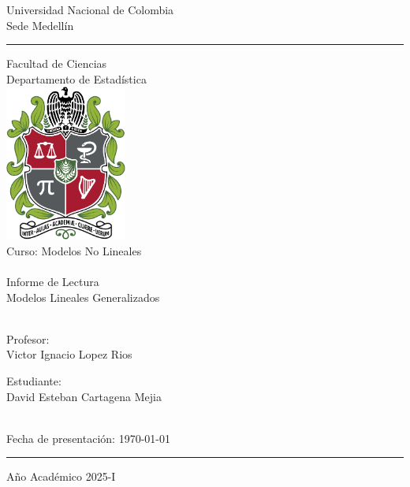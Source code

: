 \begin{titlepage}
	\begin{center}
		{\Huge  Universidad Nacional de Colombia}\\[8pt]
		{\LARGE Sede Medellín}\\[12pt]
		\hrule\vspace{15pt}
		
		{\Large  Facultad de Ciencias}\\[6pt]
		{\Large Departamento de Estadística}\\[15pt]
		
		\includegraphics[width=4cm]{logo.png}\\[20pt]
		
		{\huge Curso: Modelos No Lineales}\\[12pt]
		\hrulefill\\[8pt]
		
		{\LARGE  Informe de Lectura}\\[8pt]
		{\Large Modelos Lineales Generalizados}\\[6pt]
		\hrulefill\\[40pt]
		
		\begin{minipage}[t]{0.45\textwidth}
			\raggedright
			{\large  Profesor:}\\
			{\large Victor Ignacio Lopez Rios}
		\end{minipage}
		\hfill
		\begin{minipage}[t]{0.45\textwidth}
			\raggedleft
			{\large  Estudiante:}\\
			{\large David Esteban Cartagena Mejia}
		\end{minipage}\\[60pt]
		\vspace{0.45cm}
		{\large Fecha de presentación: \today}\\[10pt]
		\hrule\vspace{10pt}
		
		{ \Large Año Académico 2025-I}
	\end{center}
\end{titlepage}







